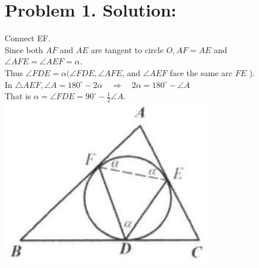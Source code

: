 \documentclass[10pt]{article}
\begin{document}
\section*{Problem 1. Solution:}
Connect EF.\\
Since both \(A F\) and \(A E\) are tangent to circle \(O, A F=A E\) and \(\angle A F E=\angle A E F=\alpha\).\\
Thus \(\angle F D E=\alpha(\angle F D E, \angle A F E\), and \(\angle A E F\) face the same arc \(F E\) ).\\
In \(\triangle A E F, \angle A=180^{\circ}-2 \alpha \quad \Rightarrow \quad 2 \alpha=180^{\circ}-\angle A\)\\
That is \(\alpha=\angle F D E=90^{\circ}-\frac{1}{2} \angle A\).\\
\includegraphics[max width=\textwidth, center]{2025_04_17_97bc1f7e44d93c271a88g-171}
\end{document}
